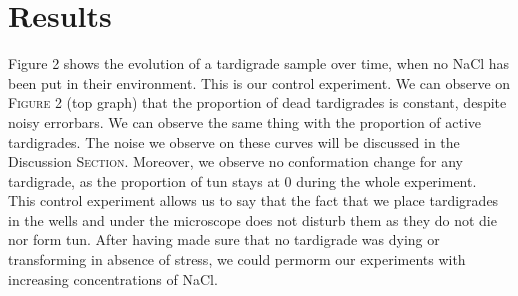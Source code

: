 \documentclass[12pt,a4paper, twocolumn]{article}
\begin{document}
\section{Results}

Figure 2 shows the evolution of a tardigrade sample over time, when no NaCl has been put in their environment. This is our control experiment. We can observe on \textsc{Figure} 2 (top graph) that the proportion of dead tardigrades is constant, despite noisy errorbars. We can observe the same thing with the proportion of active tardigrades. The noise we observe on these curves will be discussed in the Discussion \textsc{Section}. Moreover, we observe no conformation change for any tardigrade, as the proportion of tun stays at 0 during the whole experiment.\\
This control experiment allows us to say that the fact that we place tardigrades in the wells and under the microscope does not disturb them as they do not die nor form tun. After having made sure that no tardigrade was dying or transforming in absence of stress, we could permorm our experiments with increasing concentrations of NaCl.\\
\end{document}
